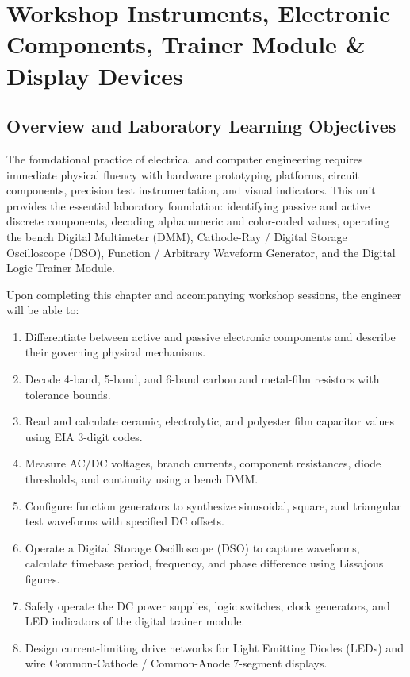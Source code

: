 \chapter{Workshop Instruments, Electronic Components, Trainer Module \& Display Devices}
\label{chap:instruments-components}

\section{Overview and Laboratory Learning Objectives}
The foundational practice of electrical and computer engineering requires immediate physical fluency with hardware prototyping platforms, circuit components, precision test instrumentation, and visual indicators. This unit provides the essential laboratory foundation: identifying passive and active discrete components, decoding alphanumeric and color-coded values, operating the bench Digital Multimeter (DMM), Cathode-Ray / Digital Storage Oscilloscope (DSO), Function / Arbitrary Waveform Generator, and the Digital Logic Trainer Module.

\begin{important}
Upon completing this chapter and accompanying workshop sessions, the engineer will be able to:
\begin{enumerate}[leftmargin=1.5em]
    \item Differentiate between active and passive electronic components and describe their governing physical mechanisms.
    \item Decode 4-band, 5-band, and 6-band carbon and metal-film resistors with tolerance bounds.
    \item Read and calculate ceramic, electrolytic, and polyester film capacitor values using EIA 3-digit codes.
    \item Measure AC/DC voltages, branch currents, component resistances, diode thresholds, and continuity using a bench DMM.
    \item Configure function generators to synthesize sinusoidal, square, and triangular test waveforms with specified DC offsets.
    \item Operate a Digital Storage Oscilloscope (DSO) to capture waveforms, calculate timebase period, frequency, and phase difference using Lissajous figures.
    \item Safely operate the DC power supplies, logic switches, clock generators, and LED indicators of the digital trainer module.
    \item Design current-limiting drive networks for Light Emitting Diodes (LEDs) and wire Common-Cathode / Common-Anode 7-segment displays.
\end{enumerate}
\end{important}

